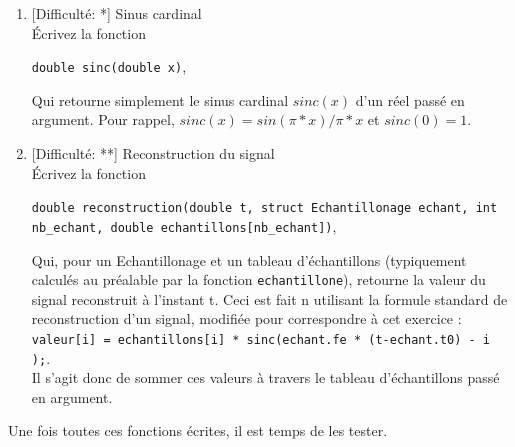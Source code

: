 \documentclass[11pt]{article}
\begin{document}
\begin{enumerate}
\item \textcolor{mygreen}{[Difficulté: *]} Sinus cardinal\\
Écrivez la fonction
\begin{center} 
\texttt{double sinc(double x)}, 
\end{center}
Qui retourne simplement le sinus cardinal $sinc(x)$ d'un réel passé en argument. Pour rappel, $sinc(x) = sin(\pi * x) / \pi*x$ et $sinc(0) = 1$.

\item \textcolor{mygreen}{[Difficulté: **]} Reconstruction du signal\\
Écrivez la fonction
\begin{center} 
\texttt{double reconstruction(double t, struct Echantillonage echant, int nb\_echant, double echantillons[nb\_echant])}, 
\end{center}
Qui, pour un Echantillonage et un tableau d'échantillons (typiquement calculés au préalable par la fonction \texttt{echantillone}), retourne la valeur du signal reconstruit à l'instant t. Ceci est fait n utilisant la formule standard de reconstruction d'un signal, modifiée pour correspondre à cet exercice :\\
\texttt{valeur[i] = echantillons[i] * sinc(echant.fe * (t-echant.t0) - i );}.\\ 
Il s'agit donc de  sommer ces valeurs à travers le tableau d'échantillons passé en argument.

\end{enumerate}

Une fois toutes ces fonctions écrites, il est temps de les tester.
\end{document}

